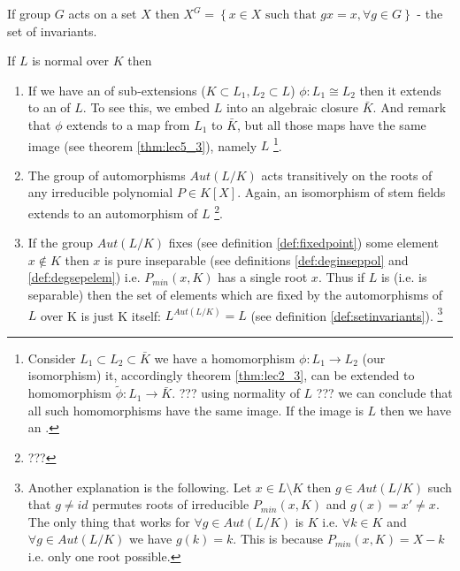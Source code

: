 \begin{definition}
  If group $G$ acts on a set $X$ then $X^G = \left\{x
  \in X \mbox{ such that } gx = x, \forall g \in G\right\}$ - the
  set of invariants.
  \label{def:setinvariants}
\end{definition}

\begin{remark}
  If $L$ is normal over $K$ then
  \begin{enumerate}
  \item If we have an  of sub-extensions
    ($K \subset L_1, L_2 \subset L$)
    $\phi: L_1 \cong L_2$ then it extends to an
     of $L$.  To see this, we embed $L$ into
    an algebraic closure $\bar{K}$. And remark that $\phi$ extends to a
    map from $L_1$ to $\bar{K}$, but all those maps have the same
    image (see theorem \ref{thm:lec5_3}), namely $L$
    \footnote{
      Consider $L_1 \subset L_2 \subset \bar{K}$ we have a
      homomorphism $\phi: L_1 \to L_2$ (our isomorphism) it,
      accordingly theorem \ref{thm:lec2_3}, can be extended to
      homomorphism $\tilde{\phi}: L_1 \to \bar{K}$.  
      ??? using normality of $L$ ??? we can conclude that all such
      homomorphisms have the same image. If the image is $L$ then we
      have an .
    }.  
  \item The group of automorphisms $Aut\left(L/K\right)$ acts
    transitively on the roots of any irreducible polynomial $P \in
    K\left[X\right]$. Again, an isomorphism of stem fields extends to
    an automorphism of $L$
    \footnote{
      ??? 
    }.
  \item If the group $Aut\left(L/K\right)$ fixes (see definition
    \label{rem:item:lec5_onnormalext_3}
    \ref{def:fixedpoint}) some element $x \notin K$ then $x$ is pure
    inseparable (see definitions 
    \ref {def:deginseppol} and \ref{def:degsepelem}) i.e.
    $P_{min}\left(x, K\right)$ has a 
    single root $x$. Thus if $L$ is
     (i.e. is separable) then
    the set of elements which are fixed  by the automorphisms  of $L$
    over K is just K itself: 
    $L^{Aut\left(L/K\right)} = L$
    (see definition \ref{def:setinvariants}).
    \footnote{
      Another explanation is the following. Let $x \in L \setminus K$
      then $g \in Aut\left(L/K\right)$ such that $g \ne id$ permutes
      roots of irreducible $P_{min}\left(x, K\right)$ and $g(x) = x'
      \ne x$. The only thing that works for 
      $\forall g \in Aut\left(L/K\right)$ is $K$ i.e.
      $\forall k \in K$ and $\forall g \in Aut\left(L/K\right)$ we
      have $g(k) = k$. This is because $P_{min}\left(x, K\right) = X
      - k$ i.e. only one root possible.
    }
  \end{enumerate}
  \label{rem:lec5_onnormalext}
\end{remark}

